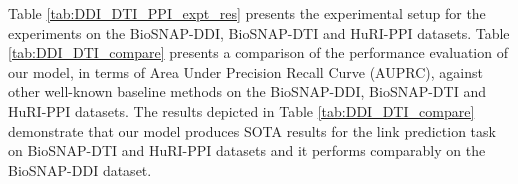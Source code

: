 \begin{comment}

\subsubsection{Protein Protein Interaction (PPI)}

We also tested our model on another important graph learning task in the biomedical domain -- PPI. Out of the 52,068 positive edges (representing interactions) in the HuRI-PPI dataset, 36,048 edges were considered for the training set and the rest (15,620) were used for testing. Negative edges were sampled maintaining 1:1 ratio for both the training and test set. Thus training took place on total 72,096
edges  (with learning rate 0.005) and testing was carried out on total 31,240 edges. Because of the absence of node feature information in the dataset, we initialized the node feature by employing the concept of supernode. 103 supernodes were constructed from 8,245 nodes (proteins), 5 supernodes of size 81 and 98 supernodes of size 80. Thus, for each node, a 103-dimensional vector is created to encode connections to 103 supernodes, and a 57-dimensional random vector, whose values lie between 0 to 1, is conjoined with it to circumvent duplicate node features, resulting in 160 dimensional initial node features. 

\end{comment}

Table \ref{tab:DDI_DTI_PPI_expt_res} presents the experimental setup for the experiments on the BioSNAP-DDI, BioSNAP-DTI and HuRI-PPI datasets.
Table \ref{tab:DDI_DTI_compare} presents a comparison of the performance evaluation of our model, in terms of Area Under Precision Recall Curve (AUPRC), against other well-known baseline methods on the BioSNAP-DDI, BioSNAP-DTI and HuRI-PPI datasets. The results depicted in Table \ref{tab:DDI_DTI_compare} demonstrate that our model produces SOTA results for the link prediction task on BioSNAP-DTI and HuRI-PPI datasets and it performs comparably on the BioSNAP-DDI dataset.


